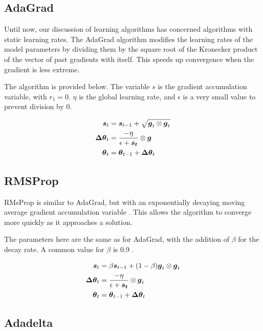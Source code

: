 \documentclass{article}
\begin{document}

\subsection{AdaGrad} %

Until now, our discussion of learning algorithms has concerned algorithms with static learning rates. The AdaGrad algorithm modifies the learning rates of the model parameters by dividing them by the square root of the Kronecker product of the vector of past gradients with itself. This speeds up convergence when the gradient is less extreme. 

The algorithm is provided below. The variable \(s\) is the gradient accumulation variable, with \(r_1 = 0\). \(\eta\) is the global learning rate, and \(\epsilon\) is a very small value to prevent division by \(0\).

\begin{align*}
    \vb*{s}_t &= \vb*{s}_{t-1} + \sqrt{\vb*{g}_t \otimes \vb*{g}_t} \\
    \vb*{\Delta \theta}_t &= \frac{-\eta}{\epsilon + \vb*{s_t}} \otimes \vb*{g} \\
    \vb*{\theta}_t &= \vb*{\theta}_{t-1} + \vb*{\Delta \theta}_t
\end{align*}

\subsection{RMSProp} %

RMsProp is similar to AdaGrad, but with an exponentially decaying moving average gradient accumulation variable \cite{Goodfellow-et-al-2016}. This allows the algorithm to converge more quickly as it approaches a solution.

The parameters here are the same as for AdaGrad, with the addition of \(\beta\) for the decay rate. A common value for \(\beta\) is 0.9 \cite{pml1book}.

\begin{align*}
    \vb*{s}_t &= \beta \vb*{s}_{t-1} + (1-\beta)\vb*{g}_t \otimes \vb*{g}_t \\
    \vb*{\Delta \theta}_t &= \frac{-\eta}{\epsilon + \vb*{s_t}} \otimes \vb*{g}_t \\
    \vb*{\theta}_t &= \vb*{\theta}_{t-1} + \vb*{\Delta \theta}_t
\end{align*}

\subsection{Adadelta} %
\end{document}
